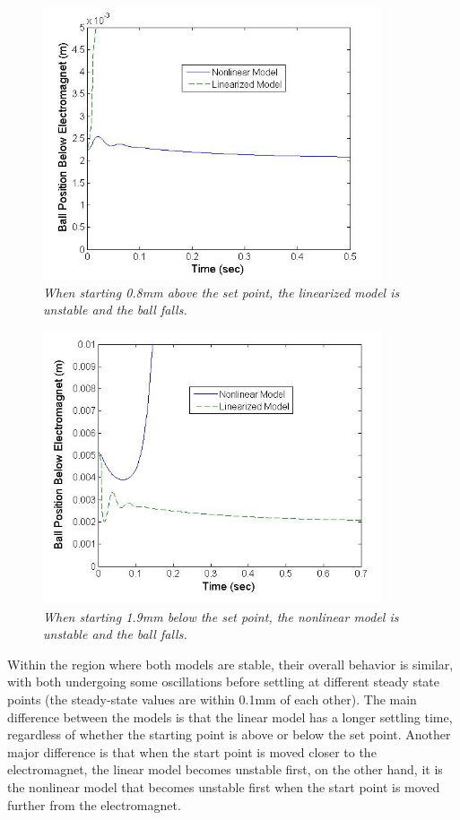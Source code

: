 \documentclass{article}
\theoremstyle{plain}
\theoremstyle{definition}
\theoremstyle{remark}
\begin{document}
\begin{figure}[h!]
\begin{center}
\includegraphics[width = 10cm]{Part2bCloseDisturbance}
\caption{\emph{When starting 0.8mm above the set point, the linearized model is unstable and the ball falls.}}
\label{Q2_b5}
\end{center}
\end{figure}

\begin{figure}[h!]
\begin{center}
\includegraphics[width = 10cm]{Part2bFarDisturbance}
\caption{\emph{When starting 1.9mm below the set point, the nonlinear model is unstable and the ball falls.}}
\label{Q2_b6}
\end{center}
\end{figure}

Within the region where both models are stable, their overall behavior is similar, with both undergoing some oscillations before settling at different steady state points (the steady-state values are within 0.1mm of each other). The main difference between the models is that the linear model has a longer settling time, regardless of whether the starting point is above or below the set point. Another major difference is that when the start point is moved closer to the electromagnet, the linear model becomes unstable first, on the other hand, it is the nonlinear model that becomes unstable first when the start point is moved further from the electromagnet. 
\end{document}

